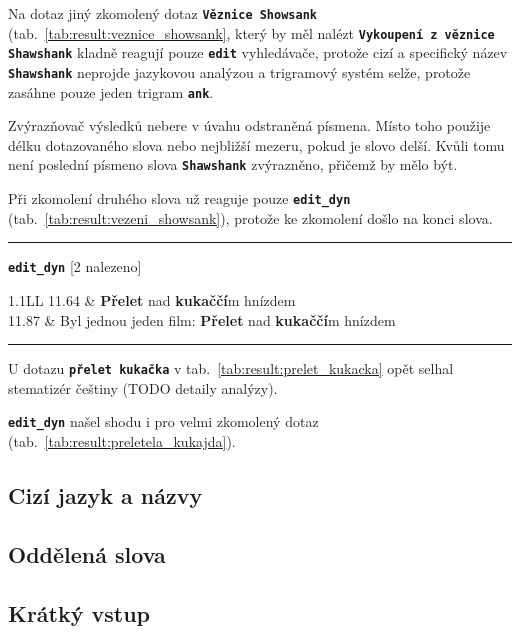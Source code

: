 \documentclass[12pt,letterpaper,oneside,openright]{book}
\newcommand{\bftt}[1]{\texttt{\textbf{#1}}}
\newcommand{\boldred}[1]{\textbf{\color{red} #1}}
\newcommand{\horizlina}%
{
    \mbox{}\vspace{1em}
    \hrule
    \mbox{}
}
\begin{document}

Na dotaz jiný zkomolený dotaz \bftt{Věznice Showsank}
(tab.~\ref{tab:result:veznice_showsank}, který by měl nalézt
\bftt{Vykoupení z věznice Shawshank} kladně reagují pouze \bftt{edit}
vyhledávače, protože cizí a specifický název \bftt{Shawshank} neprojde
jazykovou analýzou a trigramový systém selže, protože zasáhne pouze jeden
trigram \bftt{ank}.

Zvýrazňovač výsledků nebere v úvahu odstraněná písmena. Místo toho použije
délku dotazovaného slova nebo nejbližší mezeru, pokud je slovo delší. Kvůli
tomu není poslední písmeno slova \bftt{Shawshank} zvýrazněno, přičemž by mělo
být.


Při zkomolení druhého slova už reaguje pouze \bftt{edit\_dyn}
(tab.~\ref{tab:result:vezeni_showsank}), protože ke zkomolení došlo na
konci slova.



\begin{table}
\begin{tt}
\horizlina

\bftt{edit\_dyn} [2 nalezeno]\vspace{5pt}

\begin{tabulary}{1.1\textwidth}{LL}
11.64 & \boldred{Přelet} nad \boldred{kukaččí}m hnízdem \\
11.87 & Byl jednou jeden film: \boldred{Přelet} nad \boldred{kukaččí}m hnízdem \\
\end{tabulary}
\horizlina
\label{tab:result:preletela_kukajda}
\caption{Výsledek dotazu \bftt{Přeletěla kukajda}}
\end{tt}
\end{table}

U dotazu \bftt{přelet kukačka} v tab.~\ref{tab:result:prelet_kukacka} opět
selhal stematizér češtiny (TODO detaily analýzy).

\bftt{edit\_dyn} našel shodu i pro velmi zkomolený dotaz
(tab.~\ref{tab:result:preletela_kukajda}).


\subsection{Cizí jazyk a názvy}
\subsection{Oddělená slova}
\subsection{Krátký vstup}
\end{document}

